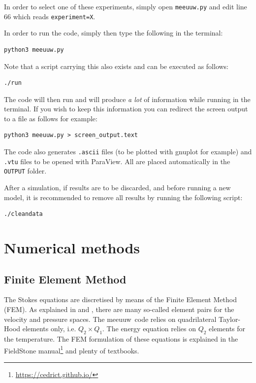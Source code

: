 \documentclass[a4paper,12pt]{article}
\newcommand{\meeuuw}{{\sc meeuuw~}}
\begin{document}
In order to select one of these experiments, simply open {\tt meeuuw.py}
and edit line 66 which reads \lstinline{experiment=X}.

In order to run the code, simply then type the following in the terminal:
\begin{verbatim}
python3 meeuuw.py
\end{verbatim}
Note that a script carrying this also exists and can be executed as follows:
\begin{verbatim}
./run
\end{verbatim}

The code will then run and will produce {\it a lot} of information 
while running in the terminal. If you wish to keep this information 
you can redirect the screen output to a file as follows for example:
\begin{verbatim}
python3 meeuuw.py > screen_output.text
\end{verbatim}
The code also generates {\tt .ascii} files (to be plotted with gnuplot for example)
and {\tt .vtu} files to be opened with ParaView. All are placed automatically 
in the {\tt OUTPUT} folder.

After a simulation, if results are to be discarded, and before running a new 
model, it is recommended to remove all results by running the following script:
\begin{verbatim}
./cleandata
\end{verbatim}




\newpage
\section{Numerical methods}

\subsection{Finite Element Method}

The Stokes equations are discretised by means of the Finite Element Method (FEM).
As explained in \textcite{thba22} and \textcite{thba25}, there are many 
so-called element pairs for the velocity and pressure spaces.  
The \meeuuw code relies
on quadrilateral Taylor-Hood elements only, i.e. $Q_2 \times Q_1$.
The energy equation relies on $Q_2$ elements for the temperature.
The FEM formulation of these equations is explained in the FieldStone 
manual\footnote{\url{https://cedrict.github.io/}} and plenty of 
textbooks.
\end{document}
